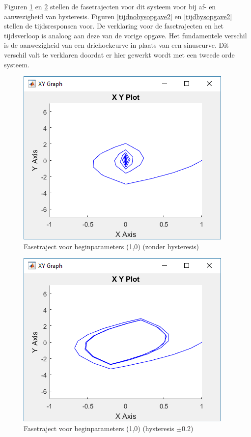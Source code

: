 \documentclass[12pt]{article}
\begin{document}
Figuren \ref{xynohysopgave2} en \ref{xyhysopgave2} stellen de fasetrajecten voor dit systeem voor bij af- en aanwezigheid van hysteresis. Figuren \ref{tijdnohysopgave2} en \ref{tijdhysopgave2} stellen de tijdsresponsen voor. De verklaring voor de fasetrajecten en het tijdsverloop is analoog aan deze van de vorige opgave. Het fundamentele verschil is de aanwezigheid van een driehoekcurve in plaats van een sinuscurve. Dit verschil valt te verklaren doordat er hier gewerkt wordt met een tweede orde systeem.
\begin{figure}[!h]
	\centering
	\includegraphics[height=0.4\textheight, keepaspectratio]{xynohysopgave2.png}
	\caption{Fasetraject voor beginparameters (1,0) (zonder hysteresis)}
	\label{xynohysopgave2}
\end{figure}
\begin{figure}[!h]
	\centering
	\includegraphics[height=0.4\textheight, keepaspectratio]{xyhysopgave2.png}
	\caption{Fasetraject voor beginparameters (1,0) (hysteresis $\pm 0.2$)}
	\label{xyhysopgave2}
\end{figure}
\end{document}
